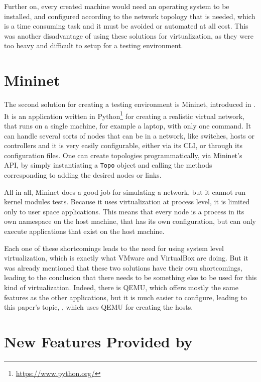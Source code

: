Further on, every created machine would need an operating system to be installed, and configured according to the network topology that is needed, which is a time consuming task and it must be avoided or automated at all cost.
This was another disadvantage of using these solutions for virtualization, as they were too heavy and difficult to setup for a testing environment.

\section{Mininet}
\label{sec:mininet}

The second solution for creating a testing environment is Mininet, introduced in .
It is an application written in Python\footnote{\url{https://www.python.org/}} for creating a realistic virtual network, that runs on a single machine, for example a laptop, with only one command.
It can handle several sorts of nodes that can be in a network, like switches, hosts or controllers and it is very easily configurable, either via its CLI, or through its configuration files.
One can create topologies programmatically, via Mininet's API, by simply instantiating a \texttt{Topo} object and calling the methods corresponding to adding the desired nodes or links.

All in all, Mininet does a good job for simulating a network, but it cannot run kernel modules tests.
Because it uses virtualization at process level, it is limited only to user space applications.
This means that every node is a process in its own namespace on the host machine, that has its own configuration, but can only execute applications that exist on the host machine.

Each one of these shortcomings leads to the need for using system level virtualization, which is exactly what VMware and VirtualBox are doing.
But it was already mentioned that these two solutions have their own shortcomings, leading to the conclusion that there needs to be something else to be used for this kind of virtualization.
Indeed, there is QEMU, which offers mostly the same features as the other applications, but it is much easier to configure, leading to this paper's topic, \project, which uses QEMU for creating the hosts.


\section{New Features Provided by \project}
\label{sec:vlab-new-features}

